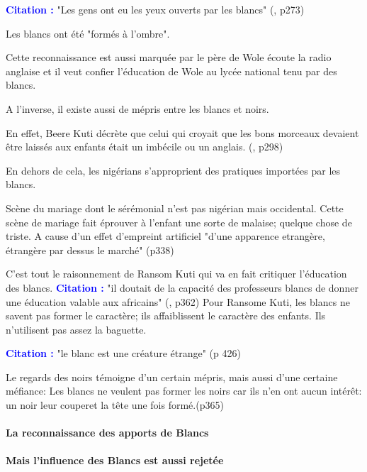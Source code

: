 \documentclass[a4paper, 11pt, hidelinks]{article}
\newcommand{\bs}{\bigskip}
\newcommand{\cit}{\large \textcolor{blue}{\textbf{Citation :}} \large }
\newcommand{\rb}[1]{\Romanbar{#1}}
\begin{document}
\cit "Les gens ont eu les yeux ouverts par les blancs" (\rb{9}, p273)

Les blancs ont été "formés à l'ombre".

Cette reconnaissance est aussi marquée par le père de Wole écoute la radio anglaise et il 
veut confier l'éducation de Wole au lycée national tenu par des blancs.
\bs


A l'inverse, il existe aussi de mépris entre les blancs et noirs.


En effet, Beere Kuti décrète que celui qui croyait que les bons morceaux devaient être laissés aux enfants
était un imbécile ou un anglais. (\rb{10}, p298)

\bs

En dehors de cela, les nigérians s'approprient des pratiques importées par les blancs.


Scène du mariage dont le sérémonial n'est pas nigérian mais occidental. Cette scène de mariage fait éprouver
à l'enfant une sorte de malaise; quelque chose de triste. A cause d'un effet d'empreint artificiel "d'une apparence
etrangère, étrangère par dessus le marché" (p338) 



C'est tout le raisonnement de  Ransom Kuti qui va en fait critiquer l'éducation des blancs. 
\cit "il doutait de la capacité des professeurs blancs de donner une éducation valable aux africains" 
(\rb{73}, p362)
Pour Ransome Kuti, les blancs ne savent pas former le caractère; ils affaiblissent le caractère des enfants.
Ils n'utilisent pas assez la baguette.

\cit "le blanc est une créature étrange" (p 426)

\bs


Le regards des noirs témoigne d'un certain mépris, mais aussi d'une certaine méfiance:
Les blancs ne veulent pas former les noirs car ils n'en ont aucun intérêt: un noir leur couperet la tête 
une fois formé.(p365)





\paragraph{La reconnaissance des apports de Blancs}







\paragraph{Mais l'influence des Blancs est aussi rejetée}
\end{document}

